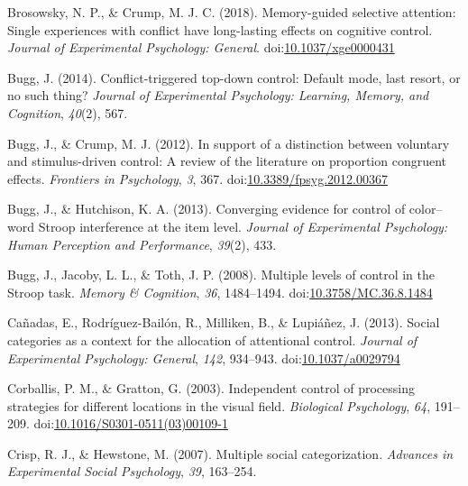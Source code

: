 \documentclass[english,,man,floatsintext]{apa6}
\begin{document}
\leavevmode\hypertarget{ref-brosowsky_memory-guided_2018}{}%
Brosowsky, N. P., \& Crump, M. J. C. (2018). Memory-guided selective attention: Single experiences with conflict have long-lasting effects on cognitive control. \emph{Journal of Experimental Psychology: General}. doi:\href{https://doi.org/10.1037/xge0000431}{10.1037/xge0000431}

\leavevmode\hypertarget{ref-bugg_conflict-triggered_2014}{}%
Bugg, J. (2014). Conflict-triggered top-down control: Default mode, last resort, or no such thing? \emph{Journal of Experimental Psychology: Learning, Memory, and Cognition}, \emph{40}(2), 567.

\leavevmode\hypertarget{ref-bugg_support_2012}{}%
Bugg, J., \& Crump, M. J. (2012). In support of a distinction between voluntary and stimulus-driven control: A review of the literature on proportion congruent effects. \emph{Frontiers in Psychology}, \emph{3}, 367. doi:\href{https://doi.org/10.3389/fpsyg.2012.00367}{10.3389/fpsyg.2012.00367}

\leavevmode\hypertarget{ref-bugg_converging_2013}{}%
Bugg, J., \& Hutchison, K. A. (2013). Converging evidence for control of color--word Stroop interference at the item level. \emph{Journal of Experimental Psychology: Human Perception and Performance}, \emph{39}(2), 433.

\leavevmode\hypertarget{ref-bugg_multiple_2008}{}%
Bugg, J., Jacoby, L. L., \& Toth, J. P. (2008). Multiple levels of control in the Stroop task. \emph{Memory \& Cognition}, \emph{36}, 1484--1494. doi:\href{https://doi.org/10.3758/MC.36.8.1484}{10.3758/MC.36.8.1484}

\leavevmode\hypertarget{ref-canadas_social_2013}{}%
Cañadas, E., Rodríguez-Bailón, R., Milliken, B., \& Lupiáñez, J. (2013). Social categories as a context for the allocation of attentional control. \emph{Journal of Experimental Psychology: General}, \emph{142}, 934--943. doi:\href{https://doi.org/10.1037/a0029794}{10.1037/a0029794}

\leavevmode\hypertarget{ref-corballis_independent_2003}{}%
Corballis, P. M., \& Gratton, G. (2003). Independent control of processing strategies for different locations in the visual field. \emph{Biological Psychology}, \emph{64}, 191--209. doi:\href{https://doi.org/10.1016/S0301-0511(03)00109-1}{10.1016/S0301-0511(03)00109-1}

\leavevmode\hypertarget{ref-crisp_multiple_2007}{}%
Crisp, R. J., \& Hewstone, M. (2007). Multiple social categorization. \emph{Advances in Experimental Social Psychology}, \emph{39}, 163--254.
\end{document}
